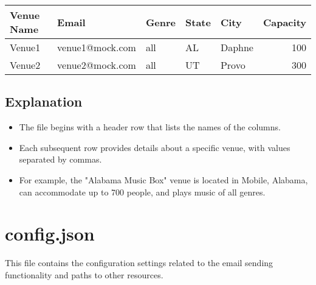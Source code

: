 \documentclass{article}
\begin{document}
	\begin{tabular}{|l|l|l|l|l|r|}
		\hline
		\textbf{Venue Name} & \textbf{Email} & \textbf{Genre} & \textbf{State} & \textbf{City} & \textbf{Capacity} \\
		\hline
		Venue1 & venue1@mock.com & all & AL & Daphne & 100 \\
		\hline
		Venue2 & venue2@mock.com & all & UT & Provo & 300 \\
		\hline
	\end{tabular}
	
	\subsection*{Explanation}
	\begin{itemize}
		\item The file begins with a header row that lists the names of the columns.
		\item Each subsequent row provides details about a specific venue, with values separated by commas.
		\item For example, the "Alabama Music Box" venue is located in Mobile, Alabama, can accommodate up to 700 people, and plays music of all genres.
	\end{itemize}
	
	\section{config.json}
	
	This file contains the configuration settings related to the email sending functionality and paths to other resources.
	
\end{document}
